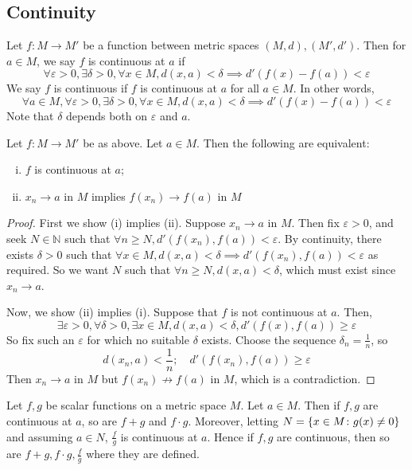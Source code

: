 \subsection{Continuity}
\begin{definition}
	Let \( f \colon M \to M' \) be a function between metric spaces \( (M, d), (M', d') \).
	Then for \( a \in M \), we say \( f \) is continuous at \( a \) if
	\[
		\forall \varepsilon > 0, \exists \delta > 0, \forall x \in M, d(x,a) < \delta \implies d'(f(x) - f(a)) < \varepsilon
	\]
	We say \( f \) is continuous if \( f \) is continuous at \( a \) for all \( a \in M \).
	In other words,
	\[
		\forall a \in M, \forall \varepsilon > 0, \exists \delta > 0, \forall x \in M, d(x,a) < \delta \implies d'(f(x) - f(a)) < \varepsilon
	\]
	Note that \( \delta \) depends both on \( \varepsilon \) and \( a \).
\end{definition}
\begin{proposition}
	Let \( f \colon M \to M' \) be as above.
	Let \( a \in M \).
	Then the following are equivalent:
	\begin{enumerate}[(i)]
		\item \( f \) is continuous at \( a \);
		\item \( x_n \to a \) in \( M \) implies \( f(x_n) \to f(a) \) in \( M \)
	\end{enumerate}
\end{proposition}
\begin{proof}
	First we show (i) implies (ii).
	Suppose \( x_n \to a \) in \( M \).
	Then fix \( \varepsilon > 0 \), and seek \( N \in \mathbb N \) such that \( \forall n \geq N, d'(f(x_n), f(a)) < \varepsilon \).
	By continuity, there exists \( \delta > 0 \) such that \( \forall x \in M, d(x,a) < \delta \implies d'(f(x_n), f(a)) < \varepsilon \) as required.
	So we want \( N \) such that \( \forall n \geq N, d(x,a) < \delta \), which must exist since \( x_n \to a \).

	Now, we show (ii) implies (i).
	Suppose that \( f \) is not continuous at \( a \).
	Then,
	\[
		\exists \varepsilon > 0, \forall \delta > 0, \exists x \in M, d(x,a) < \delta, d'(f(x), f(a)) \geq \varepsilon
	\]
	So fix such an \( \varepsilon \) for which no suitable \( \delta \) exists.
	Choose the sequence \( \delta_n = \frac{1}{n} \), so
	\[
		d(x_n,a) < \frac{1}{n};\quad d'(f(x_n), f(a)) \geq \varepsilon
	\]
	Then \( x_n \to a \) in \( M \) but \( f(x_n) \not\to f(a) \) in \( M \), which is a contradiction.
\end{proof}
\begin{proposition}
	Let \( f,g \) be scalar functions on a metric space \( M \).
	Let \( a \in M \).
	Then if \( f,g \) are continuous at \( a \), so are \( f+g \) and \( f \cdot g \).
	Moreover, letting \( N = \qty{x \in M \colon g(x) \neq 0} \) and assuming \( a \in N \), \( \frac{f}{g} \) is continuous at \( a \).
	Hence if \( f,g \) are continuous, then so are \( f+g, f \cdot g, \frac{f}{g} \) where they are defined.
\end{proposition}
